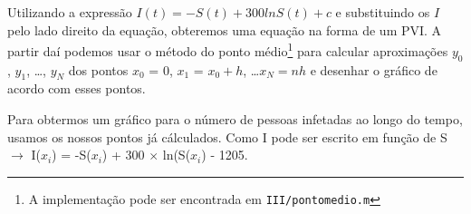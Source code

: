 \documentclass[portuguese, a4paper]{article}
\newcommand\tu[0]{\textunderscore}
\begin{document}





		\subsubsection{}
		\par

		Utilizando a expressão $I(t) = -S(t) + 300 ln S(t) + c$ e substituindo
		os $I$ pelo lado direito da equação, obteremos uma equação na forma de
		um PVI\@. A partir daí podemos usar o método do ponto médio\footnote{A
		implementação pode ser encontrada em \texttt{III/ponto\tu medio.m}}
		para calcular aproximações $y_0$, $y_1$, \ldots, $y_N$ dos pontos $x_0$
		= 0, $x_1$ = $x_0 + h$, \ldots $x_N= nh$ e desenhar o gráfico de acordo
		com esses pontos.

		Para obtermos um gráfico para o número de pessoas infetadas ao longo do
		tempo, usamos os nossos pontos já cálculados.
		Como I pode ser escrito em função de S $\rightarrow$ I($x_i$) =
		-S($x_i$) + 300 $\times$ ln(S($x_i$) - 1205.
\end{document}
